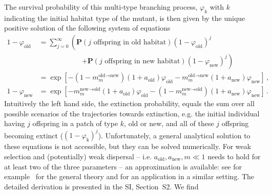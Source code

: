 \documentclass[a4paper,11pt]{article}
\begin{document}
The survival probability of this multi-type branching process, $\varphi_{k}$ with $k$ indicating the initial habitat type of the mutant, is then given by the unique positive solution of the following system of equations \citep[see][Chapters 5.3 and 5.6]{haccou_book}
\begin{equation}\label{eq:ext_prob}
	\begin{aligned}
		1-\varphi_{\text{old}} &= \sum_{j=0}^{\infty}\left( \mathbf{P}(j \text{ offspring in old habitat})(1-\varphi_{\text{old}})^j \right. \\
		&\qquad \qquad \qquad \left.+ \mathbf{P}(j \text{ offspring in new habitat})(1-\varphi_{\text{new}})^j\right)\\
		&=\exp\left[-\left(1-m^{\text{old}\to \text{new}}_m\right)(1+a_{\text{old}})\varphi_{\text{old}} - m^{\text{old}\to \text{new}}_m (1+a_{\text{new}}) \varphi_{\text{new}}\right]\, ,   \\
		1-\varphi_{\text{new}} &= \exp\left[-m^{\text{new}\to \text{old}}_m(1+a_{\text{old}})\varphi_{\text{old}} - \left(1-m^{\text{new}\to \text{old}}_m\right) (1+a_{\text{new}}) \varphi_{\text{new}}\right]\, .
	\end{aligned}
\end{equation}
Intuitively the left hand side, the extinction probability, equals the sum over all possible scenarios of the trajectories towards extinction, e.g. the initial individual having $j$ offspring in a patch of type $k$, old or new, and all of these $j$ offspring becoming extinct ($(1-\varphi_{\text{k}})^j$). Unfortunately, a general analytical solution to these equations is not accessible, but they can be solved numerically. For weak selection and (potentially) weak dispersal -- i.e. $a_{\text{old}},a_{\text{new}},m\ll 1$ needs to hold for at least two of the three parameters -- an approximation is available: see for example~\citet[Theorem~5.6]{haccou_book} for the general theory and \citet{tomasini_2018} for an application in a similar setting. The detailed derivation is presented in the SI, Section~S2. We find
\end{document}
